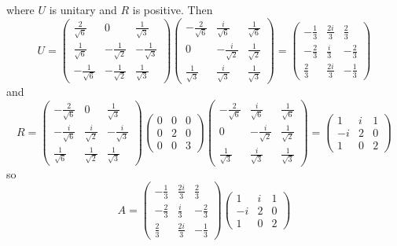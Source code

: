 \documentclass[answers]{exam}
\begin{document}
\begin{questions}
\begin{solution}
	where $U$ is unitary and $R$ is positive. Then
	$$U = \begin{pmatrix} \frac{2}{\sqrt{6}} & 0 & \frac{1}{\sqrt{3}} \\ \frac{1}{\sqrt{6}} & -\frac{1}{\sqrt{2}} & -\frac{1}{\sqrt{3}} \\ -\frac{1}{\sqrt{6}} & -\frac{1}{\sqrt{2}} & \frac{1}{\sqrt{3}} \end{pmatrix} \begin{pmatrix} -\frac{2}{\sqrt{6}} & \frac{i}{\sqrt{6}} & \frac{1}{\sqrt{6}} \\ 0 & -\frac{i}{\sqrt{2}} & \frac{1}{\sqrt{2}} \\ \frac{1}{\sqrt{3}} & \frac{i}{\sqrt{3}} & \frac{1}{\sqrt{3}} \end{pmatrix} = \begin{pmatrix} -\frac{1}{3} & \frac{2i}{3} & \frac{2}{3} \\ -\frac{2}{3} & \frac{i}{3} & -\frac{2}{3} \\ \frac{2}{3} & \frac{2i}{3} & -\frac{1}{3} \end{pmatrix}$$
	and
	$$R = \begin{pmatrix} -\frac{2}{\sqrt{6}} & 0 & \frac{1}{\sqrt{3}} \\ -\frac{i}{\sqrt{6}} & \frac{i}{\sqrt{2}} & -\frac{i}{\sqrt{3}} \\ \frac{1}{\sqrt{6}} & \frac{1}{\sqrt{2}} & \frac{1}{\sqrt{3}} \end{pmatrix} \begin{pmatrix} 0 & 0 & 0 \\ 0 & 2 & 0 \\ 0 & 0 & 3 \end{pmatrix} \begin{pmatrix} -\frac{2}{\sqrt{6}} & \frac{i}{\sqrt{6}} & \frac{1}{\sqrt{6}} \\ 0 & -\frac{i}{\sqrt{2}} & \frac{1}{\sqrt{2}} \\ \frac{1}{\sqrt{3}} & \frac{i}{\sqrt{3}} & \frac{1}{\sqrt{3}} \end{pmatrix} = \begin{pmatrix} 1 & i & 1 \\ -i & 2 & 0 \\ 1 & 0 & 2 \end{pmatrix}$$
	so
	$$A = \begin{pmatrix} -\frac{1}{3} & \frac{2i}{3} & \frac{2}{3} \\ -\frac{2}{3} & \frac{i}{3} & -\frac{2}{3} \\ \frac{2}{3} & \frac{2i}{3} & -\frac{1}{3} \end{pmatrix} \begin{pmatrix} 1 & i & 1 \\ -i & 2 & 0 \\ 1 & 0 & 2 \end{pmatrix}$$
\end{solution}


\end{questions}
\end{document}
